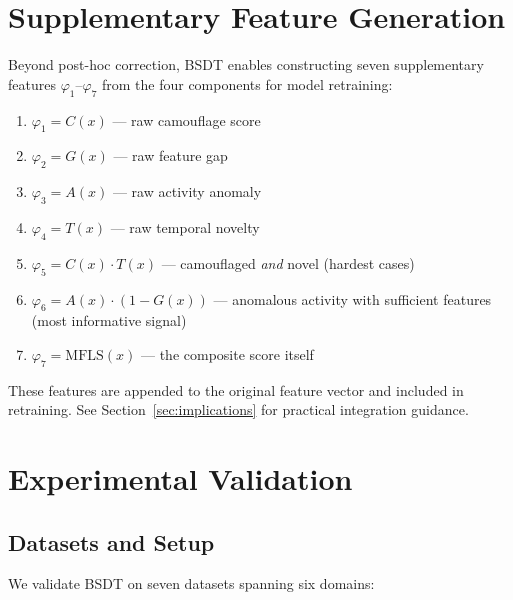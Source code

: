 \documentclass[journal]{IEEEtran}
\newcommand{\MFLS}{\mathrm{MFLS}}
\begin{document}
\section{Supplementary Feature Generation}
\label{sec:features}

Beyond post-hoc correction, BSDT enables constructing seven supplementary features $\varphi_1$--$\varphi_7$ from the four components for model retraining:

\begin{enumerate}
  \item $\varphi_1 = C(x)$ --- raw camouflage score
  \item $\varphi_2 = G(x)$ --- raw feature gap
  \item $\varphi_3 = A(x)$ --- raw activity anomaly
  \item $\varphi_4 = T(x)$ --- raw temporal novelty
  \item $\varphi_5 = C(x) \cdot T(x)$ --- camouflaged \textit{and} novel (hardest cases)
  \item $\varphi_6 = A(x) \cdot (1 - G(x))$ --- anomalous activity with sufficient features (most informative signal)
  \item $\varphi_7 = \MFLS(x)$ --- the composite score itself
\end{enumerate}

These features are appended to the original feature vector and included in retraining. See Section~\ref{sec:implications} for practical integration guidance.

\section{Experimental Validation}
\label{sec:experiments}

\subsection{Datasets and Setup}
\label{ssec:setup}

We validate BSDT on seven datasets spanning six domains:
\end{document}
